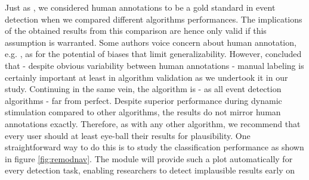 Just as \cite{Andersson2017}, we considered human annotations to be a gold
standard in event detection when we compared different algorithms performances.
The implications of the obtained results from this comparison are hence only
valid if this assumption is warranted. Some authors voice concern about human
annotation, e.g. \cite{5523936}, as for the potential of biases that limit
generalizability. However, \cite{Hooge2018} concluded that - despite obvious
variability between human annotations - manual labeling is certainly important
at least in algorithm validation as we undertook it in our study. Continuing in
the same vein, the \remodnav algorithm is - as all event detection algorithms -
far from perfect. Despite superior performance during dynamic stimulation
compared to other algorithms, the results do not mirror human annotations
exactly. Therefore, as with any other algorithm, we recommend that every user
should at least eye-ball their results for plausibility. One straightforward
way to do this is to study the classification performance as shown in figure
\ref{fig:remodnav}. The \remodnav module will provide such a plot automatically
for every detection task, enabling researchers to detect implausible results
early on





